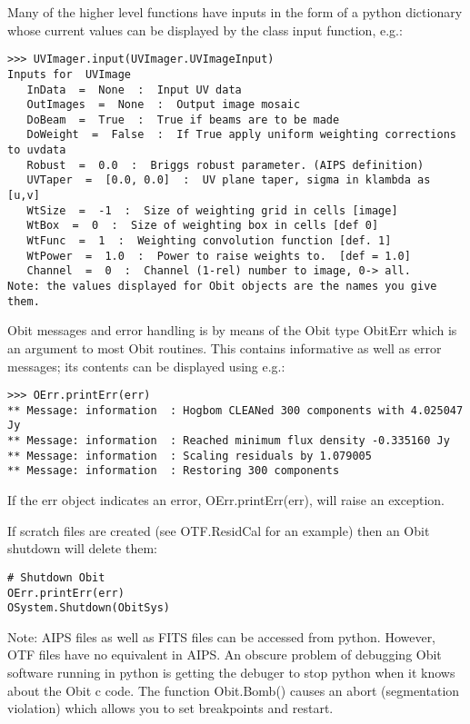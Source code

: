 \documentclass[11pt]{article}
\begin{document}
Many of the higher level functions have inputs in the form of a python dictionary
whose current values can be displayed by the class input function, e.g.:
\begin{verbatim}
>>> UVImager.input(UVImager.UVImageInput)
Inputs for  UVImage
   InData  =  None  :  Input UV data
   OutImages  =  None  :  Output image mosaic
   DoBeam  =  True  :  True if beams are to be made
   DoWeight  =  False  :  If True apply uniform weighting corrections to uvdata
   Robust  =  0.0  :  Briggs robust parameter. (AIPS definition)
   UVTaper  =  [0.0, 0.0]  :  UV plane taper, sigma in klambda as [u,v]
   WtSize  =  -1  :  Size of weighting grid in cells [image]
   WtBox  =  0  :  Size of weighting box in cells [def 0]
   WtFunc  =  1  :  Weighting convolution function [def. 1]
   WtPower  =  1.0  :  Power to raise weights to.  [def = 1.0]
   Channel  =  0  :  Channel (1-rel) number to image, 0-> all.
Note: the values displayed for Obit objects are the names you give
them.
\end{verbatim}

   Obit messages and error handling is by means of the Obit type
ObitErr which is an argument to most Obit routines.  This contains
informative as well as error messages; its contents can be displayed
using e.g.:
\begin{verbatim}
>>> OErr.printErr(err)
** Message: information  : Hogbom CLEANed 300 components with 4.025047 Jy
** Message: information  : Reached minimum flux density -0.335160 Jy
** Message: information  : Scaling residuals by 1.079005
** Message: information  : Restoring 300 components
\end{verbatim}
If  the err object indicates an error, OErr.printErr(err), will raise
an exception.

   If scratch files are created (see OTF.ResidCal for an example) then
an Obit shutdown will delete them:
\begin{verbatim}
# Shutdown Obit
OErr.printErr(err)
OSystem.Shutdown(ObitSys)
\end{verbatim}

Note: AIPS files as well as FITS files can be accessed from python.
However, OTF files have no equivalent in AIPS.
An obscure problem of debugging Obit software running in python is
getting the debuger to stop python when it knows about the Obit c
code.
The function Obit.Bomb() causes an abort (segmentation violation)
which allows you to set breakpoints and restart.
\end{document}
